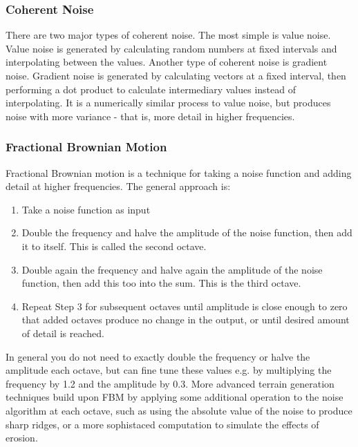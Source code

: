 \subsubsection{Coherent Noise}

There are two major types of coherent noise.
The most simple is value noise.
Value noise is generated by calculating random numbers at fixed intervals and interpolating between the values.
Another type of coherent noise is gradient noise.
Gradient noise is generated by calculating vectors at a fixed interval, then performing a dot product to calculate intermediary values instead of interpolating.
It is a numerically similar process to value noise, but produces noise with more variance - that is, more detail in higher frequencies.

\subsubsection{Fractional Brownian Motion}

Fractional Brownian motion is a technique for taking a noise function and adding detail at higher frequencies.
The general approach is:
\begin{enumerate}
\item Take a noise function as input
\item Double the frequency and halve the amplitude of the noise function, then add it to itself. This is called the second octave.
\item Double again the frequency and halve again the amplitude of the noise function, then add this too into the sum. This is the third octave.
\item Repeat Step 3 for subsequent octaves until amplitude is close enough to zero that added octaves produce no change in the output, or until desired amount of detail is reached.
\end{enumerate}

In general you do not need to exactly double the frequency or halve the amplitude each octave, but can fine tune these values e.g. by multiplying the frequency by 1.2 and the amplitude by 0.3.
More advanced terrain generation techniques build upon FBM by applying some additional operation to the noise algorithm at each octave,
such as using the absolute value of the noise to produce sharp ridges,
or a more sophistaced computation to simulate the effects of erosion.
